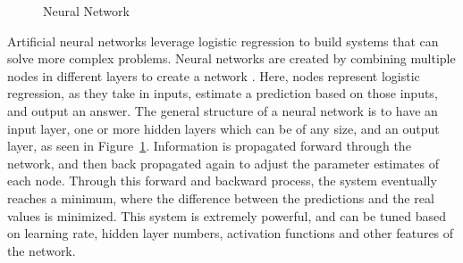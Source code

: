 \documentclass[midd]{thesis}
\begin{document}
\begin{figure}
\caption{Neural Network}
\label{fig:nn}
\end{figure}

Artificial neural networks leverage logistic regression to build systems that can solve more complex problems. Neural networks are created by combining multiple nodes in different layers to create a network \cite{Suryansh}. Here, nodes represent logistic regression, as they take in inputs, estimate a prediction based on those inputs, and output an answer. The general structure of a neural network is to have an input layer, one or more hidden layers which can be of any size, and an output layer, as seen in Figure~\ref{fig:nn}. Information is propagated forward through the network, and then back propagated again to adjust the parameter estimates of each node. Through this forward and backward process, the system eventually reaches a minimum, where the difference between the predictions and the real values is minimized. This system is extremely powerful, and can be tuned based on learning rate, hidden layer numbers, activation functions and other features of the network. 
\end{document}
